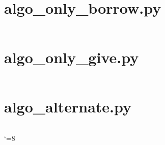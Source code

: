 \documentclass{article}
\begin{document}
\section*{algo_only_borrow.py	}\inputminted[linenos, breaklines, breakautoindent]{python}{../dollar_game/algo_only_borrow.py}\newpage
\section*{algo_only_give.py		}\inputminted[linenos, breaklines, breakautoindent]{python}{../dollar_game/algo_only_give.py}\newpage
\section*{algo_alternate.py		}\inputminted[linenos, breaklines, breakautoindent]{python}{../dollar_game/algo_alternate.py}\newpage

\catcode`=8
	
\end{document}
